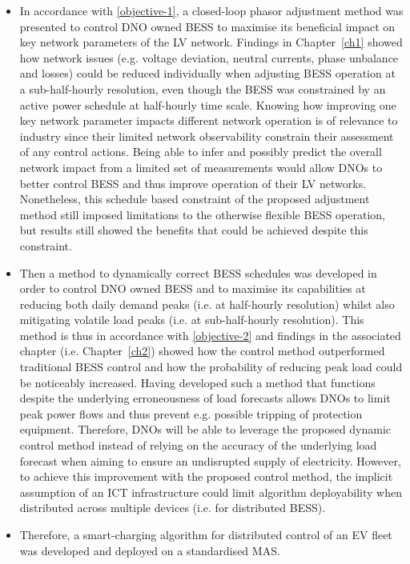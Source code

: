 \begin{itemize}
	\item
	In accordance with \ref{objective-1}, a closed-loop phasor adjustment method was presented to control DNO owned BESS to maximise its beneficial impact on key network parameters of the LV network.
	Findings in Chapter~\ref{ch1} showed how network issues (e.g. voltage deviation, neutral currents, phase unbalance and losses) could be reduced individually when adjusting BESS operation at a sub-half-hourly resolution, even though the BESS was constrained by an active power schedule at half-hourly time scale.
	Knowing how improving one key network parameter impacts different network operation is of relevance to industry since their limited network observability constrain their assessment of any control actions.
	Being able to infer and possibly predict the overall network impact from a limited set of measurements would allow DNOs to better control BESS and thus improve operation of their LV networks.
	Nonetheless, this schedule based constraint of the proposed adjustment method still imposed limitations to the otherwise flexible BESS operation, but results still showed the benefits that could be achieved despite this constraint.
	\item
	Then a method to dynamically correct BESS schedules was developed in order to control DNO owned BESS and to maximise its capabilities at reducing both daily demand peaks (i.e. at half-hourly resolution) whilst also mitigating volatile load peaks (i.e. at sub-half-hourly resolution).
	This method is thus in accordance with \ref{objective-2} and findings in the associated chapter (i.e. Chapter~\ref{ch2}) showed how the control method outperformed traditional BESS control and how the probability of reducing peak load could be noticeably increased.
	Having developed such a method that functions despite the underlying erroneousness of load forecasts allows DNOs to limit peak power flows and thus prevent e.g. possible tripping of protection equipment.
	Therefore, DNOs will be able to leverage the proposed dynamic control method instead of relying on the accuracy of the underlying load forecast when aiming to ensure an undisrupted supply of electricity.
	However, to achieve this improvement with the proposed control method, the implicit assumption of an ICT infrastructure could limit algorithm deployability when distributed across multiple devices (i.e. for distributed BESS).
	\item
	Therefore, a smart-charging algorithm for distributed control of an EV fleet was developed and deployed on a standardised MAS.

\end{itemize}
